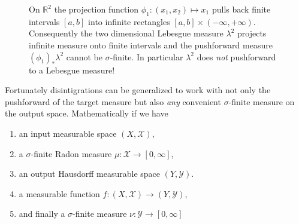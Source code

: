\documentclass[
  letterpaper,
  DIV=11,
  numbers=noendperiod]{scrartcl}
\providecommand{\tightlist}{%
  \setlength{\itemsep}{0pt}\setlength{\parskip}{0pt}}\usepackage{longtable,booktabs,array}
\begin{document}
\begin{figure}


\caption{\label{fig-lebesgue-pushforward}On \(\mathbb{R}^{2}\) the
projection function \(\phi_{1} : (x_{1}, x_{2}) \mapsto x_{1}\) pulls
back finite intervals \([a, b]\) into infinite rectangles
\([a, b] \times (-\infty, +\infty)\). Consequently the two dimensional
Lebesgue measure \(\lambda^{2}\) projects infinite measure onto finite
intervals and the pushforward measure \((\phi_{1})_{*} \lambda^{2}\)
cannot be \(\sigma\)-finite. In particular \(\lambda^{2}\) does
\emph{not} pushforward to a Lebesgue measure!}

\end{figure}%

Fortunately disintigrations can be generalized to work with not only the
pushforward of the target measure but also \emph{any} convenient
\(\sigma\)-finite measure on the output space. Mathematically if we have

\begin{enumerate}
\def\labelenumi{\arabic{enumi}.}
\tightlist
\item
  an input measurable space \((X, \mathcal{X})\),
\item
  a \(\sigma\)-finite Radon measure
  \(\mu : \mathcal{X} \rightarrow [0, \infty]\),
\item
  an output Hausdorff measurable space \((Y, \mathcal{Y})\).
\item
  a measurable function
  \(f: (X, \mathcal{X}) \rightarrow (Y, \mathcal{Y})\),
\item
  and finally a \(\sigma\)-finite measure
  \(\nu : \mathcal{Y} \rightarrow [0, \infty]\)
\end{enumerate}
\end{document}
